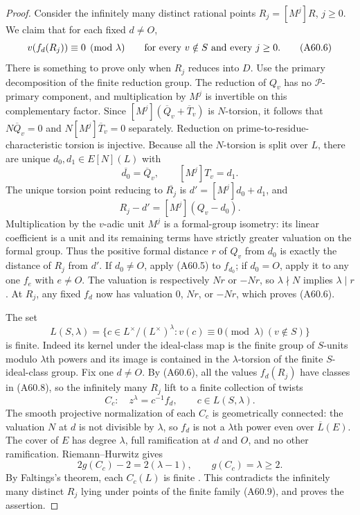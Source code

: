 \begin{proof}
Consider the infinitely many distinct rational points
$R_j=[M^j]R$, $j\ge0$. We claim that for each fixed $d\ne O$,
\[
 v(f_d(R_j))\equiv0\pmod\lambda
 \qquad\hbox{for every }v\notin S\hbox{ and every }j\ge0.
 \tag{A60.6}
\]
There is something to prove only when $R_j$ reduces into $D$.
Use the primary decomposition of the finite reduction group. The
reduction of $Q_v$ has no $\mathcal P$-primary component, and
multiplication by $M^j$ is invertible on this complementary factor.
Since $[M^j](\overline Q_v+\overline T_v)$ is $N$-torsion, it follows
that $N\overline Q_v=0$ and
$N[M^j]\overline T_v=0$ separately. Reduction on prime-to-residue-
characteristic torsion is injective. Because all the $N$-torsion
is split over $L$, there are unique $d_0,d_1\in E[N](L)$ with
\[
 \overline {d_0}=\overline Q_v,\qquad
 [M^j]T_v=d_1.
\]
The unique torsion point reducing to $\overline {R_j}$ is
$d'= [M^j]d_0+d_1$, and
\[
 R_j-d'=[M^j](Q_v-d_0).
 \tag{A60.7}
\]
Multiplication by the $v$-adic unit $M^j$ is a formal-group
isometry: its linear coefficient is a unit and its remaining
terms have strictly greater valuation on the formal group.
Thus the positive formal distance $r$ of $Q_v$ from $d_0$ is
exactly the distance of $R_j$ from $d'$.
If $d_0\ne O$, apply (A60.5) to $f_{d_0}$; if $d_0=O$, apply it
to any one $f_e$ with $e\ne O$. The valuation is respectively
$Nr$ or $-Nr$, so $\lambda\nmid N$ implies $\lambda\mid r$.
At $R_j$, any fixed $f_d$ now has valuation $0$, $Nr$, or $-Nr$,
which proves (A60.6).

The set
\[
 L(S,\lambda)=\{c\in L^\times/(L^\times)^\lambda:
                   v(c)\equiv0\pmod\lambda\ (v\notin S)\}
 \tag{A60.8}
\]
is finite. Indeed its kernel under the ideal-class map is the
finite group of $S$-units modulo $\lambda$th powers and its image
is contained in the $\lambda$-torsion of the finite $S$-ideal-class
group. Fix one $d\ne O$. By (A60.6), all the values $f_d(R_j)$
have classes in (A60.8), so the infinitely many $R_j$ lift to a
finite collection of twists
\[
 C_c:\quad z^\lambda=c^{-1}f_d,\qquad c\in L(S,\lambda).
 \tag{A60.9}
\]
The smooth projective normalization of each $C_c$ is geometrically
connected: the valuation $N$ at $d$ is not divisible by $\lambda$,
so $f_d$ is not a $\lambda$th power even over $\overline L(E)$.
The cover of $E$ has degree $\lambda$, full ramification at $d$
and $O$, and no other ramification. Riemann--Hurwitz gives
\[
 2g(C_c)-2=2(\lambda-1),\qquad g(C_c)=\lambda\ge2.
\]
By Faltings's theorem, each $C_c(L)$ is finite
\citep[Satz~7, p.~365; with the 1984 correction]{AMFaltings1983,AMFaltings1984Erratum}.
This contradicts the infinitely many distinct $R_j$ lying under
points of the finite family (A60.9), and proves the assertion.
\end{proof}

